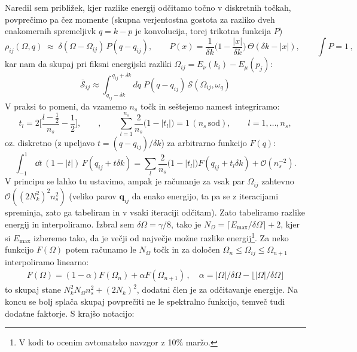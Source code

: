\documentclass[a4paper,10pt]{article}
\renewcommand{\vec}[1]{\mathbf{#1}}
\begin{document}
Naredil sem približek, kjer razlike energij odčitamo točno v diskretnih točkah, povprečimo pa čez momente (skupna verjentostna gostota za razliko dveh enakomernih spremeljivk $q = k-p$ je konvolucija, torej trikotna funkcija $P$)
\begin{equation}
\rho_{ij}(\Omega, q)\;\approx\;\delta(\Omega-\Omega_{ij})\,P(q-q_{ij}),\qquad
P(x)=\frac{1}{{\delta k}}\Big(1-\frac{|x|}{{\delta k}}\Big)\,\Theta({\delta k}-|x|),\qquad \int P=1\,,
\end{equation}
kar nam da skupaj pri fiksni energijski razliki $\Omega_{ij} = E_\nu(k_i)-E_\mu(p_j)$:
\begin{equation}
{\;\overline{\mathcal{S}}_{ij}\approx\int_{q_{ij}-{\delta k}}^{\,q_{ij}+{\delta k}}\!dq\;P(q-q_{ij})\,\mathcal{S}(\Omega_{ij}, \omega_q)\;}
\end{equation}
V praksi to pomeni, da vzamemo $n_s$ točk in seštejemo namest integriramo: 
\begin{equation}
t_l=2\Big[\frac{l-\frac12}{n_s}-\frac12\Big],\qquad
,\qquad \sum_{l=1}^{n_s}\frac{2}{n_s}\big(1-|t_l|\big)=1\,(n_s\,\text{sod}),
\qquad l=1,\dots,n_s ,
\end{equation}
oz. diskretno (z upeljavo $t = (q-q_{ij})/\delta k$) za arbitrarno funkcijo $F(q)$:
\begin{equation}
\int_{-1}^{1}\,\dd{t}\,(1-|t|)\,F(q_{ij} + t\delta k)=\sum_l\frac{2}{n_s}\big(1-|t_l|\big)  F(q_{ij} + t_l \delta k)+\mathcal O(n_s^{-2}).
\end{equation}
V principu se lahko tu ustavimo, ampak je računanje za vsak par $\Omega_{ij}$ zahtevno $\mathcal{O}((2 N_k^2)^2 n_s^2)$ (veliko parov $\vec q_{ij}$ da enako energijo, ta pa se z iteracijami spreminja, zato ga tabeliram in v vsaki iteraciji odčitam). Zato tabeliramo razlike energij in interpoliramo. Izbral sem $\delta \Omega = \gamma / 8$, tako je $N_\Omega = \lceil{E_\text{max} / \delta \Omega\rceil} + 2$, kjer si $E_\text{max}$ izberemo tako, da je večji od največje možne razlike energij\footnote{V kodi to ocenim avtomatsko navzgor z 10\% maržo.}. Za neko funkcijo $F(\Omega)$ potem računamo le $N_\Omega$ točk in za določen $\Omega_n\leq \Omega_{ij}\leq \Omega_{n+1}$ interpoliramo linearno: 
\begin{align}
  F(\Omega) = (1-\alpha)F(\Omega_n) + \alpha F(\Omega_{n+1})\,,\quad \alpha = |\Omega|/\delta\Omega - \lfloor|\Omega|/\delta\Omega\rfloor
\end{align}
to skupaj stane $N_k^2 N_\Omega n_s^2 + (2N_k)^2$, dodatni člen je za odčitavanje energije. Na koncu se bolj splača skupaj povprečiti ne le spektralno funkcijo, temveč tudi dodatne faktorje. S krajšo notacijo:  
\end{document}
